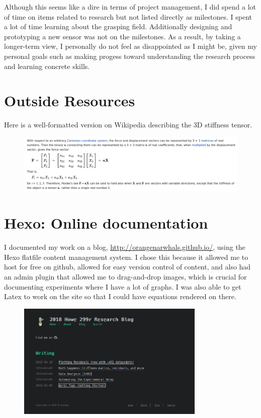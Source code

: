 \documentclass[preprint,12pt,3p]{elsarticle}
\begin{document}
Although this seems like a dire in terms of project management, I did  spend a
lot of time on items related to research but not listed directly as milestones. 
I spent a lot of time learning about the grasping field. Additionally designing and
prototyping a new sensor was not on the milestones. As a result, by taking a longer-term view, I
personally do not feel as disappointed as I might be, given my personal goals such as making progess
toward understanding the research process and learning concrete skills.

\section{Outside Resources}

Here is a well-formatted version on Wikipedia describing the 3D stiffness tensor. 

\begin{figure}[H]
\centering
\includegraphics[width=\textwidth]{images/misc/stiffness_tensor.png}
\end{figure}



\newpage

\section{Hexo: Online documentation}

I documented my work on a blog, \url{http://orangenarwhals.github.io/}, using the Hexo flatfile content
management system. I chose this because it allowed me to host for free on github, allowed for easy
version control of content, and also had an admin plugin that allowed me to drag-and-drop images,
which is crucial for documenting experiments where I have a lot of graphs. I was also able to get
Latex to work on the site so that I could have equations rendered on there.

\begin{figure}[H]
\centering
\includegraphics[width=0.8\textwidth]{images/misc/blog.png}
\end{figure}
\end{document}
